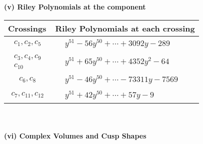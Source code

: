 \documentclass[1p]{elsarticle_modified}
\theoremstyle{definition}
\begin{document}
\newpage\renewcommand{\arraystretch}{1}
\flushleft \textbf{(v) Riley Polynomials at the component}\newline \\
\begin{tabular}{m{50pt}|m{274pt}}
Crossings & \hspace{64pt}Riley Polynomials at each crossing \\
\hline $$\begin{aligned}c_{1},c_{2},c_{5}\end{aligned}$$&$\begin{aligned}
&y^{51}-56 y^{50}+\cdots+3092 y-289
\end{aligned}$\\
\hline $$\begin{aligned}c_{3},c_{4},c_{9}\\c_{10}\end{aligned}$$&$\begin{aligned}
&y^{51}+65 y^{50}+\cdots+4352 y^2-64
\end{aligned}$\\
\hline $$\begin{aligned}c_{6},c_{8}\end{aligned}$$&$\begin{aligned}
&y^{51}-46 y^{50}+\cdots-73311 y-7569
\end{aligned}$\\
\hline $$\begin{aligned}c_{7},c_{11},c_{12}\end{aligned}$$&$\begin{aligned}
&y^{51}+42 y^{50}+\cdots+57 y-9
\end{aligned}$\\
\hline
\end{tabular}\\~\\
\newpage\flushleft \textbf{(vi) Complex Volumes and Cusp Shapes}
\end{document}
